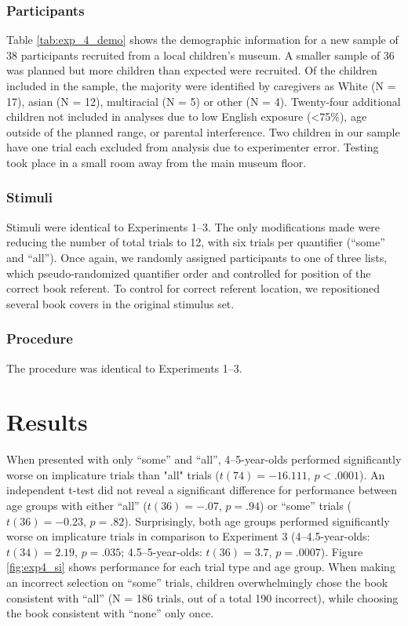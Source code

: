 \documentclass[man]{apa2}
\begin{document}
\subsubsection{Participants}

Table \ref{tab:exp_4_demo} shows the demographic information for a new sample of 38 participants recruited from a local children's museum. A smaller sample of 36 was planned but more children than expected were recruited. Of the children included in the sample, the majority were identified by caregivers as White (N = 17), asian (N = 12), multiracial (N = 5) or other (N = 4). Twenty-four additional children not included in analyses due to low English exposure (\textless 75\%), age outside of the planned range, or parental interference. Two children in our sample have one trial each excluded from analysis due to experimenter error. Testing took place in a small room away from the main museum floor.

\subsubsection{Stimuli}

Stimuli were identical to Experiments 1--3. The only modifications made were reducing the number of total trials to 12, with six trials per quantifier (``some'' and ``all''). Once again, we randomly assigned participants to one of three lists, which pseudo-randomized quantifier order and controlled for position of the correct book referent. To control for correct referent location, we repositioned several book covers in the original stimulus set.

\subsubsection{Procedure}

The procedure was identical to Experiments 1--3.

\section{Results}

When presented with only ``some'' and ``all'', 4--5-year-olds performed significantly worse on implicature trials than "all" trials ($t(74) = -16.111$, $p < .0001$). An independent t-test did not reveal a significant difference for performance between age groups with either ``all'' ($t(36) = -.07$, $p = .94$) or ``some'' trials ($t(36) = -0.23$, $p = .82$). Surprisingly, both age groups performed significantly worse on implicature trials in comparison to Experiment 3 (4--4.5-year-olds: $t(34) = 2.19$, $p = .035$; 4.5--5-year-olds: $t(36) = 3.7$, $p = .0007$). Figure \ref{fig:exp4_si} shows performance for each trial type and age group. When making an incorrect selection on ``some'' trials, children overwhelmingly chose the book consistent with ``all'' (N = 186 trials, out of a total 190 incorrect), while choosing the book consistent with ``none'' only once.
\end{document}
